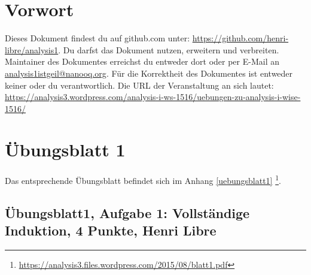 \documentclass[12pt,a4paper]{report}
\begin{document}
\newcommand \GruppeA {Henri Libre}

	\tableofcontents
	\newpage
	
	\chapter{Vorwort}
	Dieses Dokument findest du auf github.com unter: \href{https://github.com/henri-libre/analysis1}{https://github.com/henri-libre/analysis1}. Du darfst das Dokument nutzen, erweitern und verbreiten. Maintainer des Dokumentes erreichst du entweder dort oder per E-Mail an \href{analysis1istgeil@nanooq.org}{analysis1istgeil@nanooq.org}. Für die Korrektheit des Dokumentes ist entweder keiner oder du verantwortlich. Die URL der Veranstaltung an sich lautet: \href{https://analysis3.wordpress.com/analysis-i-ws-1516/uebungen-zu-analysis-i-wise-1516/}{https://analysis3.wordpress.com/analysis-i-ws-1516/uebungen-zu-analysis-i-wise-1516/}
	
	\setcounter{chapter}{1}
\chapter*{Übungsblatt 1}
	
	Das entsprechende Übungsblatt befindet sich im Anhang \ref{uebungsblatt1} \footnote{\href{https://analysis3.files.wordpress.com/2015/08/blatt1.pdf}{https://analysis3.files.wordpress.com/2015/08/blatt1.pdf}}.

\newpage		
\section{Übungsblatt1, Aufgabe 1: Vollständige Induktion, 4 Punkte, \GruppeA}
	
\end{document}
